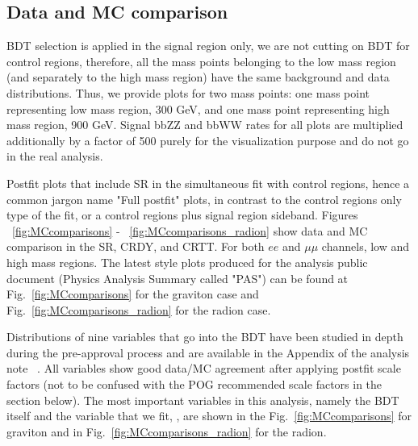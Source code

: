 \subsection{Data and MC comparison\label{sec:compareDataMC}}
BDT selection is applied in the signal region only, we are not cutting on BDT for control regions, therefore, all the mass
points belonging to the low mass region (and separately to the high mass region) have the same background and data distributions. Thus, we provide plots for two mass points: one mass point representing low mass region, 300 GeV, and one mass point representing high mass region, 900 GeV. 
Signal bbZZ and bbWW rates for all plots are multiplied additionally by a factor of 500 purely for the visualization purpose and do not go in the real analysis. 


Postfit plots that include SR in the simultaneous fit with control regions, hence a common jargon name "Full postfit" plots, in contrast to the control regions only type of the fit, or a control regions plus signal region sideband. Figures ~\ref{fig:MCcomparisons} - ~\ref{fig:MCcomparisons_radion} show data and MC comparison in the SR, CRDY, and CRTT. For both $ee$ and $\mu\mu$ channels, low and high mass regions. The latest style plots produced for the analysis public document (Physics Analysis Summary called "PAS") can be found at Fig.~\ref{fig:MCcomparisons} for the graviton case and Fig.~\ref{fig:MCcomparisons_radion} for the radion case. 



Distributions of nine variables that go into the BDT have been studied in depth during the pre-approval process and are available in the Appendix of the analysis note ~\cite{bbZZAN}. All variables show good data/MC agreement after applying postfit scale factors (not to be confused with the POG recommended scale factors in the section below). %
The most important variables in this analysis, namely the BDT itself and the variable that we fit, \mTHH, are shown in the Fig.~\ref{fig:MCcomparisons} for graviton and in Fig.~\ref{fig:MCcomparisons_radion} for the radion. 


